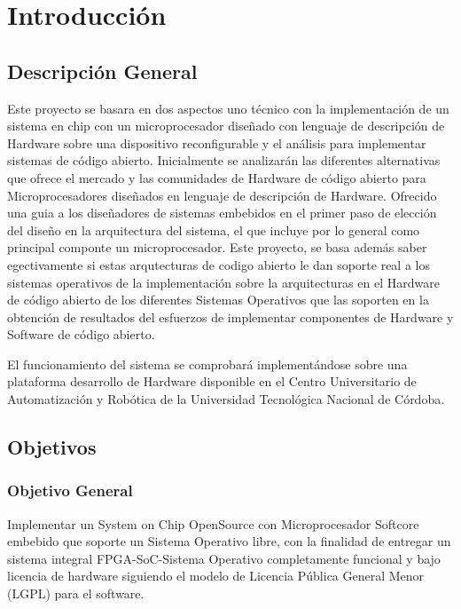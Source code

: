 \chapter{Introducción}

\section{Descripción General}
Este proyecto se basara en dos aspectos uno técnico con la implementación de un sistema en chip con  un microprocesador diseñado con lenguaje de descripción de Hardware sobre una dispositivo reconfigurable  y el análisis para implementar sistemas de código abierto. Inicialmente se analizarán las diferentes alternativas que ofrece el mercado y las comunidades de Hardware de código abierto para Microprocesadores diseñados en lenguaje de descripción de Hardware. Ofrecido una guia a los diseñadores de sistemas embebidos en el primer paso de elección del diseño en la arquitectura del sistema, el que incluye por lo general como principal componte un microprocesador.
Este proyecto, se basa además saber egectivamente si estas arqutecturas de codigo abierto le dan soporte real a los sistemas operativos
 de la implementación sobre la arquitecturas en el Hardware de código abierto de los diferentes Sistemas Operativos que las soporten   en la obtención de resultados del esfuerzos de implementar componentes de Hardware y Software de código abierto.


El funcionamiento del sistema se comprobará implementándose sobre una plataforma desarrollo de Hardware disponible en el Centro Universitario de Automatización y Robótica de la Universidad Tecnológica Nacional de Córdoba.


\section{Objetivos}
\subsection{Objetivo General}

Implementar un System on Chip OpenSource con Microprocesador Softcore embebido que soporte un Sistema Operativo libre, con la finalidad de entregar
un sistema integral FPGA-SoC-Sistema Operativo completamente funcional y bajo licencia de hardware siguiendo el modelo de Licencia Pública General Menor (LGPL) para el software.


